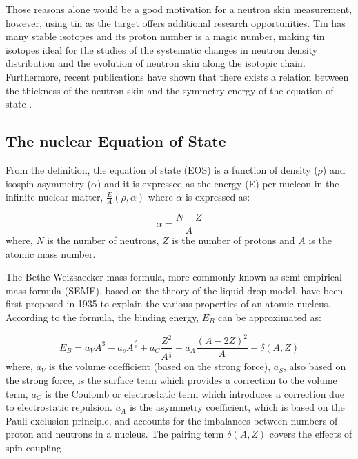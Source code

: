 \indent Those reasons alone would be a good motivation for a neutron skin measurement, however, using tin as the target offers additional research opportunities. Tin has many stable isotopes and its proton number is a magic number, making tin isotopes ideal for the studies of the systematic changes in neutron density distribution and the evolution of neutron skin along the isotopic chain. Furthermore, recent publications have shown that there exists a relation between the thickness of the neutron skin and the symmetry energy of the equation of state \cite{babrown, danielewicz, liewen2}.

\subsection{The nuclear Equation of State}

\indent From the definition, the equation of state (EOS) is a function of density ($\rho$) and isospin asymmetry ($\alpha$) and it is expressed as the energy (E) per nucleon in the infinite nuclear matter, $\frac{E}{A} (\rho,\alpha)$ where $\alpha$ is expressed as:

\begin{equation}
\alpha=\frac{N-Z}{A}
\end{equation}
where, $N$ is the number of neutrons, $Z$ is the number of protons and $A$ is the atomic mass number.

\indent The Bethe-Weizsaecker mass formula, more commonly known as semi-empirical mass formula (SEMF), based on the theory of the liquid drop model, have been first proposed in 1935 to explain the various properties of an atomic nucleus. According to the formula, the binding energy, $E_{B}$ can be approximated as:

\begin{equation}
E_{B}=a_{V}A^{3}-a_{s}A^{\frac{2}{3}}+a_{C}\frac{Z^{2}}{A^{\frac{1}{3}}}-a_{A}\frac{(A-2Z)^{2}}{A}-\delta(A,Z)
\end{equation}
where, $a_{V}$ is the volume coefficient (based on the strong force), $a_{S}$, also based on the strong force, is the surface term which provides a correction to the volume term, $a_{C}$ is the Coulomb or electrostatic term which introduces a correction due to electrostatic repulsion. $a_{A}$ is the asymmetry coefficient, which is based on the Pauli exclusion principle, and accounts for the imbalances between numbers of proton and neutrons in a nucleus. The pairing term $\delta(A,Z)$ covers the effects of spin-coupling \cite{bertulani}.

